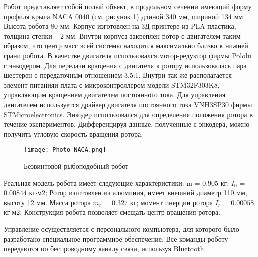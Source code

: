 Робот представляет собой полый объект, в продольном сечении имеющий форму профиля крыла NACA 0040 (см. рисунок \ref{Photo_NACA}) длиной 340 мм, шириной 134 мм. Высота робота 80 мм. Корпус изготовлен на 3Д-принтере из PLA-пластика, толщина стенки -- 2 мм. Внутри корпуса закреплен ротор с двигателем таким образом, что центр масс всей системы находится максимально близко к нижней грани робота. В качестве двигателя использовался мотор-редуктор фирмы Pololu с энкодером. Для передачи вращения с двигателя к ротору использовалась пара шестерен с передаточным отношением 3.5:1. Внутри так же располагается элемент питанияи плата с микроконтроллером модели STM32F303K8, управляющим вращением двигателем постоянного тока. Для управления двигателем используется драйвер двигателя постоянного тока VNH3SP30 фирмы STMicroelectronics. Энкодер использовался для определения положения ротора в течение экспериментов. Дифференцируя данные, полученные с энкодера, можно получить угловую скорость вращения ротора.


\begin{figure}[h]
	\centering
	\texttt{[image: Photo\_NACA.png]}%
	\caption{Безвинтовой рыбоподобный робот}
	\label{Photo_NACA}
\end{figure}

Реальная модель робота имеет следующие характеристики: m = $0.905$ кг; $I_0$ = $0.00844$ кг$\cdot$м2; Ротор изготовлен из алюминия, имеет внешний диаметр 110 мм, высоту 12 мм. Масса ротора $m_r$ = $0.327$ кг; момент инерции ротора $I_r$ = $0.00058$ кг$\cdot$м2. Конструкция робота позволяет смещать центр вращения ротора.

Управление осуществляется с персонального компьютера, для которого было разработано специальное программное обеспечение. Все команды роботу передаются по беспроводному каналу связи, используя Bluetooth.

\clearpage